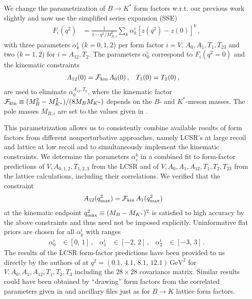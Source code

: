 \documentclass[twocolumn,epjc3]{svjour3}
\numberwithin{equation}{section}
\renewcommand{\[}{\big[}
\renewcommand{\]}{\big]}
\renewcommand{\(}{\big(}
\renewcommand{\)}{\big)}
\begin{document}
We change the parametrization of $B\to K^*$ form factors w.r.t. our previous
work \cite{Beaujean:2013soa} slightly and now use the simplified series
expansion (SSE) \cite{Bharucha:2010im}
\begin{align}
  \label{eq:SSE-FF-parametrization}
  F_i(q^2) & =
  \frac{1}{1 - q^2/M_{R,i}^2} \sum_k \alpha_k^i \left[z(q^2) - z(0)\right]^k \,,
\end{align}
with three parameters $\alpha_k^i$ ($k=0,1,2$) per form factor $i = V,\, A_0,A_1,
T_1,T_{23}$ and two ($k=1,2$) for $i= A_{12}, T_2$. The parameters $\alpha_0^i$
correspond to $F_i(q^2 = 0)$ and the kinematic constraints
\begin{align}
  A_{12}(0) & = {\cal F}_{\rm kin}\, A_0(0) \,, &
  T_1(0) & = T_2(0) \,,
\end{align}
are used to eliminate $\alpha_0^{A_{12}, T_2}$, where the kinematic factor
${\cal F}_{\rm kin} \equiv (M_B^2 - M_{K^*}^2)/(8 M_B M_{K^*})$ depends on the
$B$- and $K^*$-meson masses. The {pole} masses $M_{R,i}$ are set to
the values given in \cite{Straub:2015ica}.

This parametrization allows us to consistently combine available results of
form factors from different nonperturbative approaches, namely LCSR's at large
recoil and lattice at low recoil and to simultaneously implement the kinematic
constraints. We determine the parameters $\alpha_i^k$ in a combined fit to
form-factor predictions of $V, A_{0,1,2},T_{1,2,3}$ from the LCSR
\cite{Straub:2015ica} and of $V, A_0,A_1,A_{12},T_1,T_2,T_{23}$ from the lattice
\cite{Horgan:2013hoa, Horgan:2015vla} calculations, including their
correlations. We verified that the  constraint
\begin{align}
  \label{eq:A12-constraint-q2max}
  A_{12}(q_{\rm max}^2) & = {\cal F}_{\rm kin}\, A_1(q_{\rm max}^2)
\end{align}
at the kinematic endpoint $q_{\rm max}^2 \equiv (M_B - M_{K^*})^2$ is satisfied
to high accuracy by the above constraints and thus need not be imposed
explicitly. Uninformative flat priors are chosen for all $\alpha_k^i$ with
ranges
\begin{align}
  \alpha_0^i & \in [0,\, 1] \,, &
  \alpha_{1}^i & \in [-2,\, 2]  \,, &
  \alpha_{2}^i & \in [-3,\, 3] \,.
\end{align}
The results of the LCSR form-factor predictions have been provided to us
directly by the authors of \cite{Straub:2015ica} at $q^2 = (0.1,\, 4.1,\, 8.1,\,
12.1)\, \mbox{GeV}^2$ for $V, A_0,A_1,A_{12},T_1,T_2,T_{3}$ including the
$28\times 28$ covariance matrix. Similar results could have been obtained by
``drawing'' form factors from the correlated parameters given in
\cite{Straub:2015ica} and ancillary files just as for $B \to K$ lattice form
factors.
\end{document}

